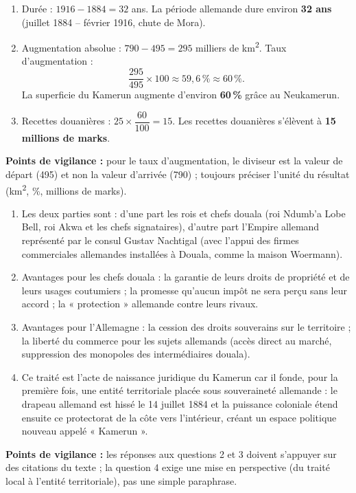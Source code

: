 \documentclass[11pt]{article}
\begin{document}
\begin{corrige}
\begin{enumerate}
    \item Durée : $1916 - 1884 = 32$ ans. La période allemande dure environ \textbf{32 ans} (juillet 1884 -- février 1916, chute de Mora).
    \item Augmentation absolue : $790 - 495 = 295$ milliers de km\textsuperscript{2}. Taux d'augmentation :
    \[ \frac{295}{495} \times 100 \approx 59,6\,\% \approx 60\,\%. \]
    La superficie du Kamerun augmente d'environ \textbf{60\,\%} grâce au Neukamerun.
    \item Recettes douanières : $25 \times \dfrac{60}{100} = 15$. Les recettes douanières s'élèvent à \textbf{15 millions de marks}.
\end{enumerate}
\textbf{Points de vigilance :} pour le taux d'augmentation, le diviseur est la valeur de départ (495) et non la valeur d'arrivée (790) ; toujours préciser l'unité du résultat (km\textsuperscript{2}, \%, millions de marks).
\end{corrige}

\begin{corrige}
\begin{enumerate}
    \item Les deux parties sont : d'une part les rois et chefs douala (roi Ndumb'a Lobe Bell, roi Akwa et les chefs signataires), d'autre part l'Empire allemand représenté par le consul Gustav Nachtigal (avec l'appui des firmes commerciales allemandes installées à Douala, comme la maison Woermann).
    \item Avantages pour les chefs douala : la garantie de leurs droits de propriété et de leurs usages coutumiers ; la promesse qu'aucun impôt ne sera perçu sans leur accord ; la « protection » allemande contre leurs rivaux.
    \item Avantages pour l'Allemagne : la cession des droits souverains sur le territoire ; la liberté du commerce pour les sujets allemands (accès direct au marché, suppression des monopoles des intermédiaires douala).
    \item Ce traité est l'acte de naissance juridique du Kamerun car il fonde, pour la première fois, une entité territoriale placée sous souveraineté allemande : le drapeau allemand est hissé le 14 juillet 1884 et la puissance coloniale étend ensuite ce protectorat de la côte vers l'intérieur, créant un espace politique nouveau appelé « Kamerun ».
\end{enumerate}
\textbf{Points de vigilance :} les réponses aux questions 2 et 3 doivent s'appuyer sur des citations du texte ; la question 4 exige une mise en perspective (du traité local à l'entité territoriale), pas une simple paraphrase.
\end{corrige}
\end{document}
